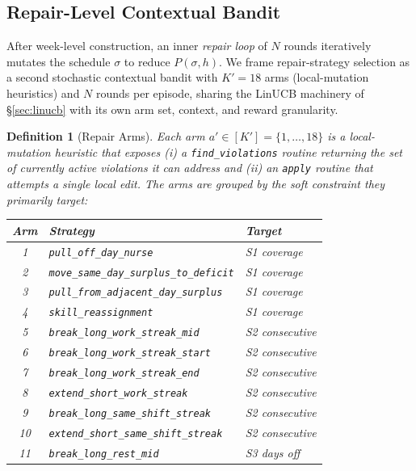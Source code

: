 \documentclass[11pt]{article}
\newtheorem{definition}{Definition}
\begin{document}
\subsection{Repair-Level Contextual Bandit}

After week-level construction, an inner \emph{repair loop} of $N$
rounds iteratively mutates the schedule $\sigma$ to reduce
$P(\sigma, h)$. We frame repair-strategy selection as a second
stochastic contextual bandit with $K' = 18$ arms (local-mutation
heuristics) and $N$ rounds per episode, sharing the LinUCB machinery
of \S\ref{sec:linucb} with its own arm set, context, and reward
granularity.

\begin{definition}[Repair Arms]
  Each arm $a' \in [K'] = \{1,\ldots,18\}$ is a local-mutation
  heuristic that exposes (i) a \texttt{find\_violations} routine
  returning the set of currently active violations it can address
  and (ii) an \texttt{apply} routine that attempts a single local
  edit. The arms are grouped by the soft constraint they primarily
  target:
  \begin{center}\small
  \begin{tabular}{cll}
    \toprule
    Arm & Strategy & Target \\
    \midrule
    1  & \texttt{pull\_off\_day\_nurse}               & S1 coverage \\
    2  & \texttt{move\_same\_day\_surplus\_to\_deficit} & S1 coverage \\
    3  & \texttt{pull\_from\_adjacent\_day\_surplus}  & S1 coverage \\
    4  & \texttt{skill\_reassignment}                  & S1 coverage \\
    5  & \texttt{break\_long\_work\_streak\_mid}      & S2 consecutive \\
    6  & \texttt{break\_long\_work\_streak\_start}    & S2 consecutive \\
    7  & \texttt{break\_long\_work\_streak\_end}      & S2 consecutive \\
    8  & \texttt{extend\_short\_work\_streak}         & S2 consecutive \\
    9  & \texttt{break\_long\_same\_shift\_streak}    & S2 consecutive \\
    10 & \texttt{extend\_short\_same\_shift\_streak}  & S2 consecutive \\
    11 & \texttt{break\_long\_rest\_mid}              & S3 days off \\

\end{tabular}
\end{center}
\end{definition}
\end{document}
